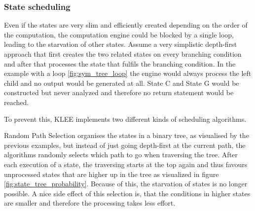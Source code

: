 \subsubsection{State scheduling}\label{section:state_scheduling}
Even if the states are very slim and efficiently created depending on the order of the computation, the computation engine could be blocked by a single loop, leading to the starvation of other states. Assume a very simplistic depth-first approach that first creates the two related states on every branching condition and after that processes the state that fulfils the branching condition. In the example with a loop \ref{fig:sym_tree_loop} the engine would always process the left child and no output would be generated at all. State C and State G would be constructed but never analyzed and therefore no return statement would be reached.

To prevent this, KLEE implements two different kinds of scheduling algorithms. 

Random Path Selection organises the states in a binary tree, as visualised by the previous examples, but instead of just going depth-first at the current path, the algorithms randomly selects which path to go when traversing the tree. After each execution of a state, the traversing starts at the top again and thus favours unprocessed states that are higher up in the tree as visualized in figure \ref{fig:state_tree_probability}. Because of this, the starvation of states is no longer possible. A nice side effect of this selection is, that the conditions in higher states are smaller and therefore the processing takes less effort.

